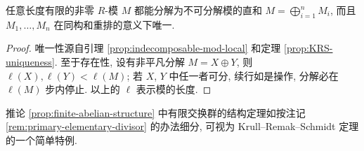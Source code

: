 \begin{corollary}
	任意长度有限的非零 $R$-模 $M$ 都能分解为不可分解模的直和 $M = \bigoplus_{i=1}^n M_i$, 而且 $M_1, \ldots, M_n$ 在同构和重排的意义下唯一.
\end{corollary}
\begin{proof}
	唯一性源自引理 \ref{prop:indecomposable-mod-local} 和定理 \ref{prop:KRS-uniqueness}. 至于存在性, 设有非平凡分解 $M = X \oplus Y$, 则 $\ell(X), \ell(Y) < \ell(M)$; 若 $X$, $Y$ 中任一者可分, 续行如是操作, 分解必在 $\ell(M)$ 步内停止. 以上的 $\ell$ 表示模的长度.
\end{proof}

推论 \ref{prop:finite-abelian-structure} 中有限交换群的结构定理如按注记 \ref{rem:primary-elementary-divisor} 的办法细分, 可视为 Krull--Remak--Schmidt 定理的一个简单特例.

